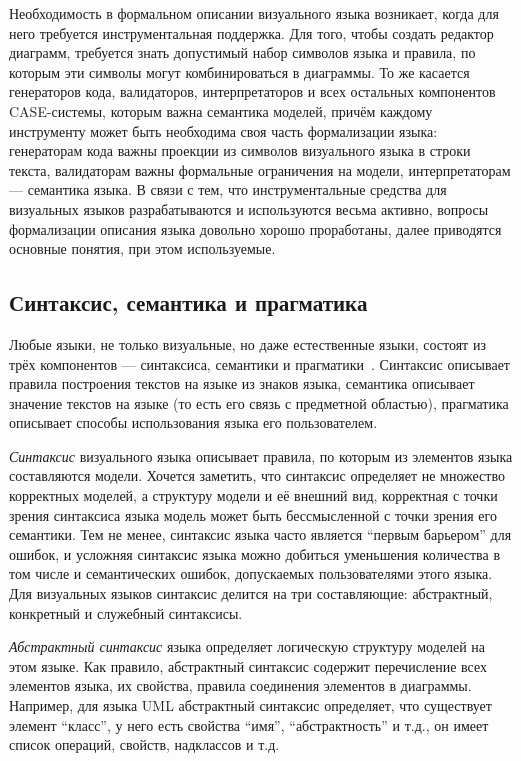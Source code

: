 Необходимость в формальном описании визуального языка возникает, когда для него 
требуется инструментальная поддержка. Для того, чтобы создать редактор диаграмм, 
требуется знать допустимый набор символов языка и правила, по которым эти 
символы могут комбинироваться в диаграммы. То же касается генераторов кода, 
валидаторов, интерпретаторов и всех остальных компонентов \ac{CASE}-системы, которым 
важна семантика моделей, причём каждому инструменту может быть необходима своя 
часть формализации языка: генераторам кода важны проекции из символов 
визуального языка в строки текста, валидаторам важны формальные ограничения на 
модели, интерпретаторам --- семантика языка. В связи с тем, что инструментальные 
средства для визуальных языков разрабатываются и используются весьма активно, 
вопросы формализации описания языка довольно хорошо проработаны, далее 
приводятся основные понятия, при этом используемые.

\subsection{Синтаксис, семантика и прагматика}
Любые языки, не только визуальные, но даже естественные языки, состоят из трёх 
компонентов --- синтаксиса, семантики и прагматики~\cite{koznov2008osnovy}. 
Синтаксис описывает правила построения текстов на языке из знаков языка, семантика описывает значение 
текстов на языке (то есть его связь с предметной областью), прагматика описывает 
способы использования языка его пользователем.

\textit{Синтаксис} визуального языка описывает правила, по которым из элементов языка 
составляются модели. Хочется заметить, что синтаксис определяет не множество 
корректных моделей, а структуру модели и её внешний вид, корректная с точки 
зрения синтаксиса языка модель может быть бессмысленной с точки зрения его 
семантики. Тем не менее, синтаксис языка часто является "`первым барьером"' для 
ошибок, и усложняя синтаксис языка можно добиться уменьшения количества в том 
числе и семантических ошибок, допускаемых пользователями этого языка. Для 
визуальных языков синтаксис делится на три составляющие: абстрактный, 
конкретный и служебный синтаксисы.

\textit{Абстрактный синтаксис} языка определяет логическую структуру моделей на этом 
языке. Как правило, абстрактный синтаксис содержит перечисление всех элементов 
языка, их свойства, правила соединения элементов в диаграммы. Например, для 
языка \ac{UML} абстрактный синтаксис определяет, что существует элемент "`класс"', 
у него есть свойства "`имя"', "`абстрактность"' и т.д., он имеет список 
операций, свойств, надклассов и т.д.

